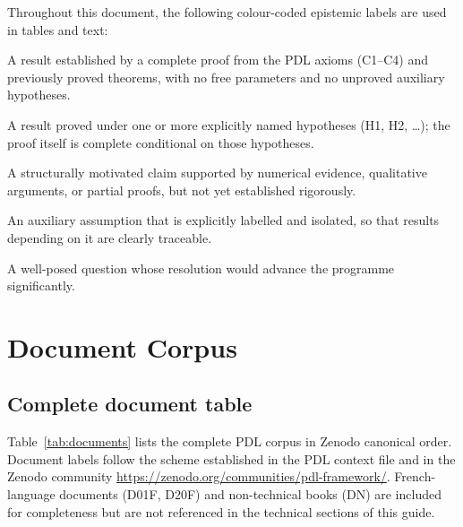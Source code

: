 \documentclass[11pt,a4paper]{article}
\theoremstyle{plain}
\theoremstyle{definition}
\theoremstyle{remark}
\begin{document}
Throughout this document, the following colour-coded epistemic labels are used in tables and text:
\begin{description}[leftmargin=2.5cm,style=nextline]
\item[\textcolor{proofblue}{Theorem}] A result established by a complete proof from the PDL axioms (C1--C4) and previously proved theorems, with no free parameters and no unproved auxiliary hypotheses.
\item[\textcolor{proofblue}{Theorem (H)}] A result proved under one or more explicitly named hypotheses (H1, H2, \ldots); the proof itself is complete conditional on those hypotheses.
\item[\textcolor{conjecturegreen}{Conjecture}] A structurally motivated claim supported by numerical evidence, qualitative arguments, or partial proofs, but not yet established rigorously.
\item[\textcolor{hypothesisorange}{Named Hypothesis}] An auxiliary assumption that is explicitly labelled and isolated, so that results depending on it are clearly traceable.
\item[\textcolor{openproblemred}{Open Problem}] A well-posed question whose resolution would advance the programme significantly.
\end{description}

\section{Document Corpus}
\label{sec:corpus}

\subsection{Complete document table}
\label{subsec:doc_table}

Table~\ref{tab:documents} lists the complete PDL corpus in Zenodo canonical order.
Document labels follow the scheme established in the PDL context file and in the Zenodo community \url{https://zenodo.org/communities/pdl-framework/}.
French-language documents (D01F, D20F) and non-technical books (DN) are included for completeness but are not referenced in the technical sections of this guide.

\setlength{\LTpre}{12pt}
\setlength{\LTpost}{6pt}
\end{document}

